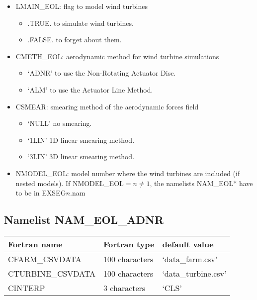 \begin{itemize}

\item LMAIN\_EOL: flag to model wind turbines
\begin{itemize}
\item .TRUE.  to simulate wind turbines.
\item .FALSE. to forget about them.
\end{itemize}

\item CMETH\_EOL: aerodynamic method for wind turbine simulations
\begin{itemize}
\item `ADNR' to use the  Non-Rotating Actuator Disc.
\item `ALM' to use the Actuator Line Method.
\end{itemize}

\item CSMEAR: smearing method of the aerodynamic forces field
\begin{itemize}
\item `NULL' no smearing.
\item `1LIN' 1D linear smearing method.
\item `3LIN' 3D linear smearing method.
\end{itemize}

\item NMODEL\_EOL: model number where the wind turbines are included (if nested models). If NMODEL\_EOL$=n\neq1$, the namelists NAM\_EOL* have to be in EXSEG\underline{$n$}.nam

\end{itemize}
\subsection{Namelist NAM\_EOL\_ADNR}

\begin{center}
\begin{tabular} {|l|l|l|}
\hline
Fortran name & Fortran type & default value \\
\hline
CFARM\_CSVDATA      & 100 characters   & `data\_farm.csv' \\
CTURBINE\_CSVDATA   & 100 characters   & `data\_turbine.csv' \\
CINTERP             & 3 characters     & `CLS' \\
\hline
\end{tabular}
\end{center}

